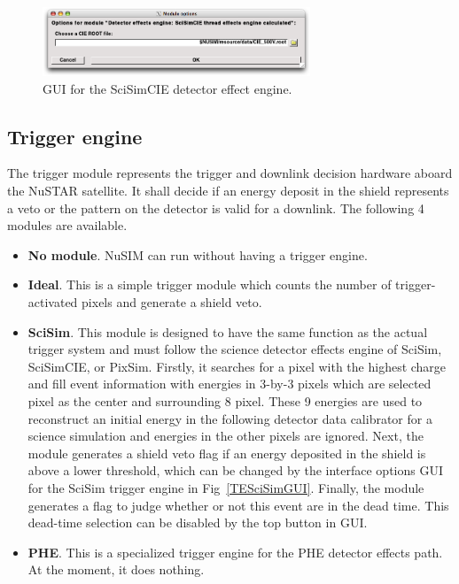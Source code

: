 \begin{figure}[tb]
 \begin{center}
  \includegraphics[width=8cm]{images/DetectorEffectEngineSciSimCIEGUI.png}
  \caption{GUI for the SciSimCIE detector effect engine.}
  \label{DEESciSimCIEGUI}
 \end{center}
\end{figure}


\subsection{Trigger engine}

The trigger module represents the trigger and downlink decision hardware
aboard the NuSTAR satellite. It shall decide if an energy deposit in the
shield represents a veto or the pattern on the detector is valid for
a downlink. The following 4 modules are available.
\begin{itemize}
 \item \textbf{No module}.
       NuSIM can run without having a trigger engine.
 \item \textbf{Ideal}.
       This is a simple trigger module which counts the number of
       trigger-activated pixels and generate a shield veto.
 \item \textbf{SciSim}.
       This module is designed to have the same function as the actual
       trigger system and must follow the science detector effects
       engine of SciSim, SciSimCIE, or PixSim.
       Firstly, it searches for a pixel with the highest
       charge and fill event information
       with energies in 3-by-3 pixels which are selected pixel as
       the center and surrounding 8 pixel.
       These 9 energies are used to reconstruct an initial energy
       in the following detector data calibrator for a science
       simulation and energies in the other pixels are ignored.
       Next, the module generates a shield veto flag if an energy
       deposited in the shield is above a lower threshold, which
       can be changed by the interface options GUI for the SciSim
       trigger engine in Fig~\ref{TESciSimGUI}.
       Finally, the module generates a flag to judge whether or not
       this event are in the dead time. This dead-time selection
       can be disabled by the top button in GUI.
 \item \textbf{PHE}.
       This is a specialized trigger engine for the PHE detector
       effects path. At the moment, it does nothing.
\end{itemize}

